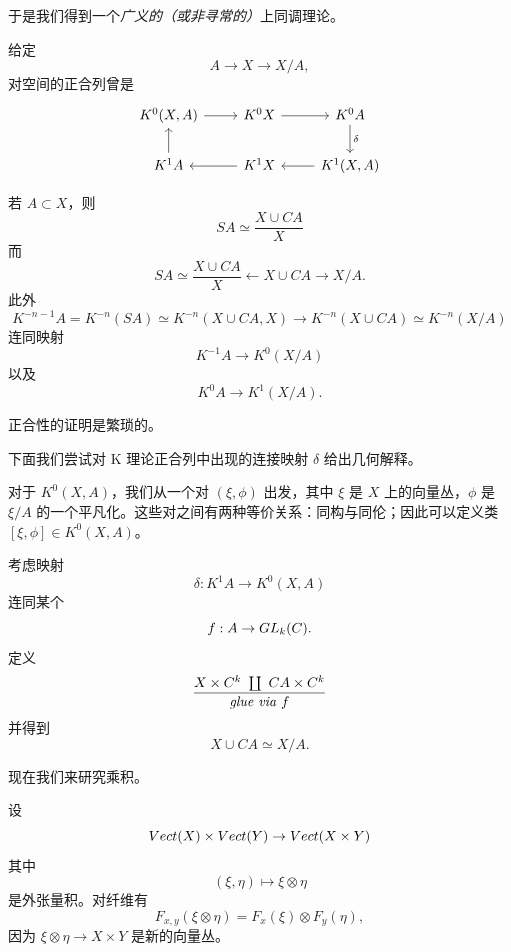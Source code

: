 
于是我们得到一个\emph{广义的（或非寻常的）}上同调理论。

给定
\[ A\to X\to X/A, \]
对空间的正合列曾是
\[
\begin{tikzcd}
K^0(X,A) \arrow[r] & K^0X \arrow[r] & K^0A \arrow[d,"\delta"] \\
K^1A \arrow[u] & K^1X \arrow[l] & K^1(X,A) \arrow[l]
\end{tikzcd}
\]

若 $A\subset X$，则
\[ SA\simeq\frac{X\cup CA}{X} \]
而
\[ SA\simeq\frac{X\cup CA}{X}\leftarrow X\cup CA\to X/A. \]
此外
\[ K^{-n-1}A = K^{-n}(SA)\simeq K^{-n}(X\cup CA,X)\to K^{-n}(X\cup CA)\simeq K^{-n}(X/A) \]
连同映射
\[ K^{-1}A\to K^0(X/A) \]
以及
\[ K^0A\to K^1(X/A). \]


正合性的证明是繁琐的。

下面我们尝试对 K 理论正合列中出现的连接映射 $\delta$ 给出几何解释。

对于 $K^0(X,A)$，我们从一个对 $(\xi,\phi)$ 出发，其中 $\xi$ 是 $X$ 上的向量丛，$\phi$ 是 $\xi/A$ 的一个平凡化。这些对之间有两种等价关系：同构与同伦；因此可以定义类 $[\xi,\phi]\in K^0(X,A)$。

考虑映射
\[ \delta : K^1A\to K^0(X,A) \]
连同某个
\[ f : A\to GL_k(C). \]
定义
\[ \frac{X\times\C^k\ \coprod\ CA\times\C^k}{\textit{glue via } f} \]
并得到
\[ X\cup CA\simeq X/A. \]


现在我们来研究乘积。

设
\[ Vect(X)\times Vect(Y)\to Vect(X\times Y) \]
其中
\[ (\xi,\eta)\mapsto\xi\otimes\eta \]
是外张量积。对纤维有
\[ F_{x,y}(\xi\otimes\eta) = F_x(\xi)\otimes F_y(\eta), \]
因为 $\xi\otimes\eta\to X\times Y$ 是新的向量丛。


